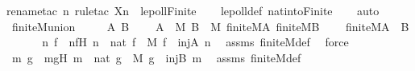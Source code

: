 \begin{isabellebody}
{\isacharparenleft}{\kern0pt}rename{\isacharunderscore}{\kern0pt}tac\ n{\isacharcomma}{\kern0pt}\ rule{\isacharunderscore}{\kern0pt}tac\ X{\isacharequal}{\kern0pt}n\ \ lepoll{\isacharunderscore}{\kern0pt}Finite{\isacharparenright}{\kern0pt}\isanewline
\ \ \isamarkupfalse%
\ lepoll{\isacharunderscore}{\kern0pt}def\ nat{\isacharunderscore}{\kern0pt}into{\isacharunderscore}{\kern0pt}Finite\isanewline
\ \ \isamarkupfalse%
\ auto%
\endisatagproof
{\isafoldproof}%
%
\isadelimproof
\isanewline
%
\endisadelimproof
\isanewline
{}\isamarkupfalse%
\ finite{\isacharunderscore}{\kern0pt}M{\isacharunderscore}{\kern0pt}union\ {\isacharcolon}{\kern0pt}\ \isanewline
\ \ \ A\ B\ \isanewline
\ \ \ {\isachardoublequoteopen}A\ {\isasymin}\ M{\isachardoublequoteclose}\ {\isachardoublequoteopen}B\ {\isasymin}\ M{\isachardoublequoteclose}\ {\isachardoublequoteopen}finite{\isacharunderscore}{\kern0pt}M{\isacharparenleft}{\kern0pt}A{\isacharparenright}{\kern0pt}{\isachardoublequoteclose}\ {\isachardoublequoteopen}finite{\isacharunderscore}{\kern0pt}M{\isacharparenleft}{\kern0pt}B{\isacharparenright}{\kern0pt}{\isachardoublequoteclose}\ \isanewline
\ \ \ {\isachardoublequoteopen}finite{\isacharunderscore}{\kern0pt}M{\isacharparenleft}{\kern0pt}A\ {\isasymunion}\ B{\isacharparenright}{\kern0pt}{\isachardoublequoteclose}\isanewline
%
\isadelimproof
%
\endisadelimproof
%
\isatagproof
{}\isamarkupfalse%
\ {\isacharminus}{\kern0pt}\ \isanewline
\ \ \isamarkupfalse%
\ n\ f\ \ nfH{\isacharcolon}{\kern0pt}\ {\isachardoublequoteopen}n\ {\isasymin}\ nat{\isachardoublequoteclose}\ {\isachardoublequoteopen}f\ {\isasymin}\ M{\isachardoublequoteclose}\ {\isachardoublequoteopen}f\ {\isasymin}\ inj{\isacharparenleft}{\kern0pt}A{\isacharcomma}{\kern0pt}\ n{\isacharparenright}{\kern0pt}{\isachardoublequoteclose}\ \isamarkupfalse%
\ assms\ finite{\isacharunderscore}{\kern0pt}M{\isacharunderscore}{\kern0pt}def\ \isamarkupfalse%
\ force\isanewline
\ \ \isamarkupfalse%
\ m\ g\ \ mgH{\isacharcolon}{\kern0pt}\ {\isachardoublequoteopen}m\ {\isasymin}\ nat{\isachardoublequoteclose}\ {\isachardoublequoteopen}g\ {\isasymin}\ M{\isachardoublequoteclose}\ {\isachardoublequoteopen}g\ {\isasymin}\ inj{\isacharparenleft}{\kern0pt}B{\isacharcomma}{\kern0pt}\ m{\isacharparenright}{\kern0pt}{\isachardoublequoteclose}\ \isamarkupfalse%
\ assms\ finite{\isacharunderscore}{\kern0pt}M{\isacharunderscore}{\kern0pt}def\ \isamarkupfalse%

\end{isabellebody}
